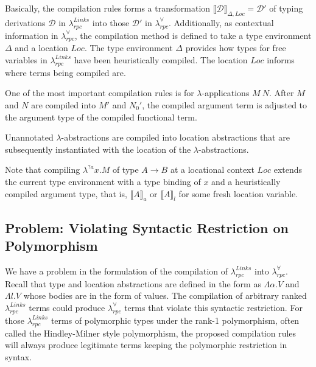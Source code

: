 \documentclass[a4paper]{article}
\theoremstyle{plain}
\theoremstyle{definition}
\newcommand{\polyrpc}{$\lambda_{rpc}^{\forall}$\xspace}
\newcommand{\linksrpc}{$\lambda_{rpc}^{Links}$\xspace}
\newcommand{\lamL}[3]{\lambda^{#1}#2.#3}
\newcommand{\linkstycomp}[2]{\llbracket#1\rrbracket_{#2}}
\newcommand{\judgcomp}[2]{\llbracket#1\rrbracket_{#2}}
\newcommand{\Loc}{Loc}
\begin{document}
%
Basically, the compilation rules forms a transformation
$\judgcomp{\mathcal{D}}{\Delta,\Loc}=\mathcal{D'}$ of typing derivations
$\mathcal{D}$ in \linksrpc into those $\mathcal{D'}$ in \polyrpc.
%
Additionally, as contextual information in \polyrpc, the
compilation method is defined to take a type environment $\Delta$ and a
location $\Loc$.
%
The type environment $\Delta$ provides how types for free variables in
\linksrpc have been heuristically compiled.
%
The location $\Loc$ informs where terms being compiled are.


%
One of the most important compilation rules is for $\lambda$-applications $M
\ N$.
%
After $M$ and $N$ are compiled into $M'$ and $N_0'$, the compiled
argument term is adjusted to the argument type of the compiled
functional term.

%
Unannotated $\lambda$-abstractions are compiled into location
abstractions that are subsequently instantiated with the location of
the $\lambda$-abstractions.

%
Note that compiling $\lamL{?a}{x}{M}$ of type $A \rightarrow B$ at a
locational context $\Loc$ extends the current type environment with a
type binding of $x$ and a heuristically compiled argument type, that
is, $\linkstycomp{A}{a}$ or $\linkstycomp{A}{l}$ for some fresh location
variable.

\subsection{Problem: Violating Syntactic Restriction on Polymorphism}

%
We have a problem in the formulation of the compilation of \linksrpc
into \polyrpc.
%
Recall that type and location abstractions are defined in the form as
$\Lambda\alpha.V$ and $\Lambda l.V$ whose bodies are in the form of
values.
%
The compilation of arbitrary ranked \linksrpc terms could produce
\polyrpc terms that violate this syntactic restriction.
%
For those \linksrpc terms of polymorphic types under the rank-1
polymorphism, often called the Hindley-Milner style polymorphism, the
proposed compilation rules will always produce legitimate terms
keeping the polymorphic restriction in syntax.
\end{document}
